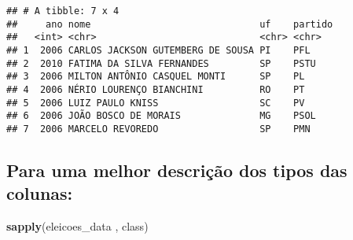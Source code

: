 \documentclass[]{article}
\newenvironment{Shaded}{\begin{snugshade}}{\end{snugshade}}
\newcommand{\KeywordTok}[1]{\textcolor[rgb]{0.13,0.29,0.53}{\textbf{#1}}}
\newcommand{\DecValTok}[1]{\textcolor[rgb]{0.00,0.00,0.81}{#1}}
\newcommand{\StringTok}[1]{\textcolor[rgb]{0.31,0.60,0.02}{#1}}
\newcommand{\OperatorTok}[1]{\textcolor[rgb]{0.81,0.36,0.00}{\textbf{#1}}}
\newcommand{\NormalTok}[1]{#1}
\begin{document}
\begin{Shaded}
\end{Shaded}

\begin{verbatim}
## # A tibble: 7 x 4
##     ano nome                              uf    partido
##   <int> <chr>                             <chr> <chr>  
## 1  2006 CARLOS JACKSON GUTEMBERG DE SOUSA PI    PFL    
## 2  2010 FATIMA DA SILVA FERNANDES         SP    PSTU   
## 3  2006 MILTON ANTÔNIO CASQUEL MONTI      SP    PL     
## 4  2006 NÉRIO LOURENÇO BIANCHINI          RO    PT     
## 5  2006 LUIZ PAULO KNISS                  SC    PV     
## 6  2006 JOÃO BOSCO DE MORAIS              MG    PSOL   
## 7  2006 MARCELO REVOREDO                  SP    PMN
\end{verbatim}

\subsection{Para uma melhor descrição dos tipos das
colunas:}\label{para-uma-melhor-descricao-dos-tipos-das-colunas}

\begin{Shaded}
\begin{Highlighting}[]
\KeywordTok{sapply}\NormalTok{(eleicoes_data , class)}
\end{Highlighting}
\end{Shaded}
\end{document}
